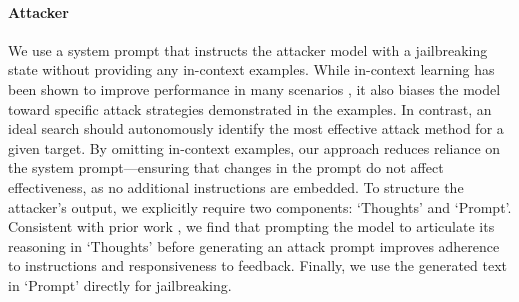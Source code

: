 \paragraph{Attacker}\label{app: att_sys}
We use a system prompt that instructs the attacker model with a jailbreaking state without providing any in-context examples. While in-context learning has been shown to improve performance in many scenarios \cite{dong2024surveyincontextlearning}, it also biases the model toward specific attack strategies demonstrated in the examples. In contrast, an ideal search should autonomously identify the most effective attack method for a given target. By omitting in-context examples, our approach reduces reliance on the system prompt—ensuring that changes in the prompt do not affect effectiveness, as no additional instructions are embedded. To structure the attacker’s output, we explicitly require two components: ‘Thoughts’ and ‘Prompt'. Consistent with prior work \cite{chao2024jailbreakingblackboxlarge,mehrotra2024treeattacksjailbreakingblackbox}, we find that prompting the model to articulate its reasoning in ‘Thoughts’ before generating an attack prompt improves adherence to instructions and responsiveness to feedback. Finally, we use the generated text in ‘Prompt’ directly for jailbreaking.


